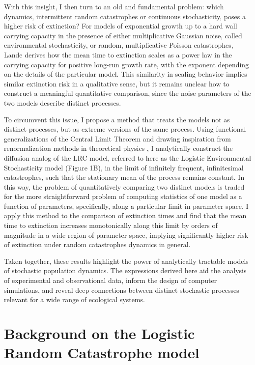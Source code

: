 With this insight, I then turn to an old and fundamental problem: which dynamics, intermittent random catastrophes or continuous stochasticity, poses a higher risk of extinction?  For models of exponential growth up to a hard wall carrying capacity in the presence of either multiplicative Gaussian noise, called environmental stochasticity, or random, multiplicative Poisson catastrophes, Lande \cite{lande1993risks}  derives how the mean time to extinction scales as a power law in the carrying capacity for positive long-run growth rate, with the exponent depending on the details of the particular model.  This similarity in scaling behavior implies similar extinction risk in a qualitative sense, but it remains unclear how to construct a meaningful quantitative comparison, since the noise parameters of the two models describe distinct processes.  

To circumvent this issue, I propose a method that treats the models not as distinct processes, but as extreme versions of the same process.  Using functional generalizations of the Central Limit Theorem \cite{jacod2013limit} and drawing inspiration from renormalization methods in theoretical physics \cite{peskin1995quantum,jona1975renormalization}, I analytically construct the diffusion analog of the LRC model, referred to here as the Logistic Environmental Stochasticity model (Figure 1B), in the limit of infinitely frequent, infinitesimal catastrophes, such that the stationary mean of the process remains constant.  In this way, the problem of quantitatively comparing two distinct models is traded for the more straightforward problem of computing statistics of one model as a function of parameters, specifically, along a particular limit in parameter space.  I apply this method to the comparison of extinction times and find that the mean time to extinction increases monotonically along this limit by orders of magnitude in a wide region of parameter space, implying significantly higher risk of extinction under random catastrophes dynamics in general.

Taken together, these results highlight the power of analytically tractable models of stochastic population dynamics.  The expressions derived here aid the analysis of experimental and observational data, inform the design of computer simulations, and reveal deep connections between distinct stochastic processes relevant for a wide range of ecological systems.


\section{Background on the Logistic Random Catastrophe model}

